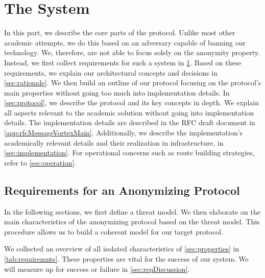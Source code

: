 

\part{The  \MessageVortex System}\label{sec:coreMVProtocol}
In this part, we describe the core parts of the \MessageVortex{} protocol. Unlike most other academic attempts, we do this based on an adversary capable of banning our technology. We, therefore, are not able to focus solely on the anonymity property. Instead, we first collect requirements for such a system in \cref{sec:genRequirements}. Based on these requirements, we explain our architectural concepts and decisions in \cref{sec:rationale}. We then build an outline of our protocol focusing on the protocol's main properties without going too much into implementation details. In \cref{sec:protocol}, we describe the protocol and its key concepts in depth. We explain all aspects relevant to the academic solution without going into implementation details. The implementation details are described in the RFC draft document in \cref{app:rfcMessageVortexMain}. Additionally, we describe the implementation's academically relevant details and their realization in infrastructure, in \cref{sec:implementation}. For operational concerns such as route building strategies, refer to \cref{sec:operation}.

\chapter{Requirements for an Anonymizing Protocol}\label{sec:genRequirements}
In the following sections, we first define a threat model. We then elaborate on the main characteristics of the anonymizing protocol based on the threat model. This procedure allows us to build a coherent model for our target protocol.

We collected an overview of all isolated characteristics of \cref{sec:properties} in \cref{tab:requiremnts}. These properties are vital for the success of our system. We will measure up for success or failure in \cref{sec:reqDiscussion}.

